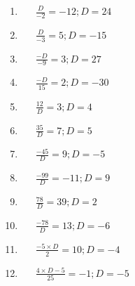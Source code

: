 \documentclass[a4paper,12pt]{article}
\begin{document}
\begin{multicols}{3}
	\begin{enumerate}[label=\footnotesize \roman*)]
		\item~~~$\displaystyle \frac{D}{-2}=-12; D=24$
		\item~~~$\displaystyle \frac{D}{-3}=5; D=-15$
		\item~~~$\displaystyle \frac{-D}{-9}=3; D=27$
		\item~~~$\displaystyle \frac{-D}{15}=2; D=-30$
		\item~~~$\displaystyle \frac{12}{D}=3; D=4$
		\item~~~$\displaystyle \frac{35}{D}=7; D=5$
		\item~~~$\displaystyle \frac{-45}{D}=9; D=-5$
		\item~~~$\displaystyle \frac{-99}{D}=-11; D=9$
		\item~~~$\displaystyle \frac{78}{D}=39; D=2$
		\item~~~$\displaystyle \frac{-78}{D}=13; D=-6$
		\item~~~$\displaystyle \frac{-5\times D}{2}=10; D=-4$
		\item~~~$\displaystyle \frac{4 \times D -5}{25}= -1; D=-5$
	\end{enumerate}
\end{multicols}
\end{document}
